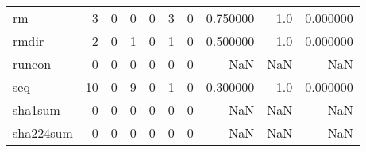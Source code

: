 \begin{tabular}{lrrrrrrrrr}
rm        &                                       3 &                                                  0 &                                                  0 &                                                  0 &                                                  3 &                                                  0 &                                           0.750000 &                                    1.0 &                             0.000000 \\
rmdir     &                                       2 &                                                  0 &                                                  1 &                                                  0 &                                                  1 &                                                  0 &                                           0.500000 &                                    1.0 &                             0.000000 \\
runcon    &                                       0 &                                                  0 &                                                  0 &                                                  0 &                                                  0 &                                                  0 &                                                NaN &                                    NaN &                                  NaN \\
seq       &                                      10 &                                                  0 &                                                  9 &                                                  0 &                                                  1 &                                                  0 &                                           0.300000 &                                    1.0 &                             0.000000 \\
sha1sum   &                                       0 &                                                  0 &                                                  0 &                                                  0 &                                                  0 &                                                  0 &                                                NaN &                                    NaN &                                  NaN \\
sha224sum &                                       0 &                                                  0 &                                                  0 &                                                  0 &                                                  0 &                                                  0 &                                                NaN &                                    NaN &                                  NaN \\

\end{tabular}
